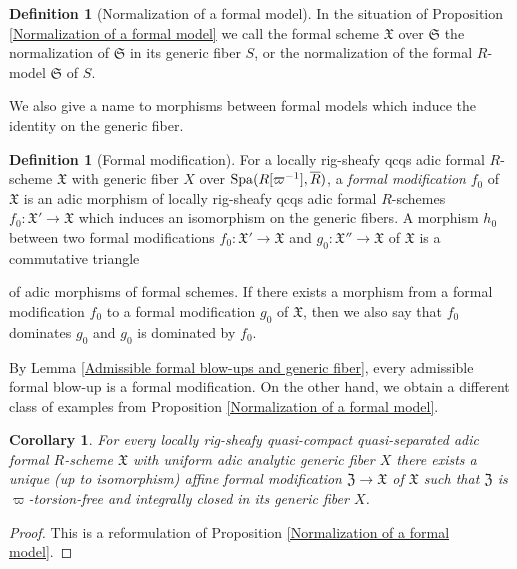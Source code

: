 \documentclass[12pt,twoside,a4paper]{article}
\newtheorem{cor}[thm]{Corollary}
\theoremstyle{definition}
\newtheorem{mydef}[thm]{Definition}
\theoremstyle{remark}
\newcommand\Spa{{\rm Spa}}
\begin{document}
\begin{mydef}[Normalization of a formal model]\label{Definition of normalization}In the situation of Proposition \ref{Normalization of a formal model} we call the formal scheme $\mathfrak{X}$ over $\mathfrak{S}$ the normalization of $\mathfrak{S}$ in its generic fiber $S$, or the normalization of the formal $R$-model $\mathfrak{S}$ of $S$.\end{mydef}
We also give a name to morphisms between formal models which induce the identity on the generic fiber. 
\begin{mydef}[Formal modification]\label{Definition of formal modification}For a locally rig-sheafy qcqs adic formal $R$-scheme $\mathfrak{X}$ with generic fiber $X$ over $\Spa(R[\varpi^{-1}], \overline{R})$, a \textit{formal modification} $f_{0}$ of $\mathfrak{X}$ is an adic morphism of locally rig-sheafy qcqs adic formal $R$-schemes $f_{0}: \mathfrak{X}'\to\mathfrak{X}$ which induces an isomorphism on the generic fibers. A morphism $h_{0}$ between two formal modifications $f_{0}: \mathfrak{X}'\to\mathfrak{X}$ and $g_{0}: \mathfrak{X}''\to\mathfrak{X}$ of $\mathfrak{X}$ is a commutative triangle \begin{center}\end{center}of adic morphisms of formal schemes. If there exists a morphism from a formal modification $f_{0}$ to a formal modification $g_{0}$ of $\mathfrak{X}$, then we also say that $f_{0}$ dominates $g_{0}$ and $g_{0}$ is dominated by $f_{0}$.\end{mydef}
By Lemma \ref{Admissible formal blow-ups and generic fiber}, every admissible formal blow-up is a formal modification. On the other hand, we obtain a different class of examples from Proposition \ref{Normalization of a formal model}.
\begin{cor}\label{Normalization of a formal model 2}For every locally rig-sheafy quasi-compact quasi-separated adic formal $R$-scheme $\mathfrak{X}$ with uniform adic analytic generic fiber $X$ there exists a unique (up to isomorphism) affine formal modification $\mathfrak{Z}\to \mathfrak{X}$ of $\mathfrak{X}$ such that $\mathfrak{Z}$ is $\varpi$-torsion-free and integrally closed in its generic fiber $X$.\end{cor}
\begin{proof}This is a reformulation of Proposition \ref{Normalization of a formal model}.\end{proof}
\end{document}
